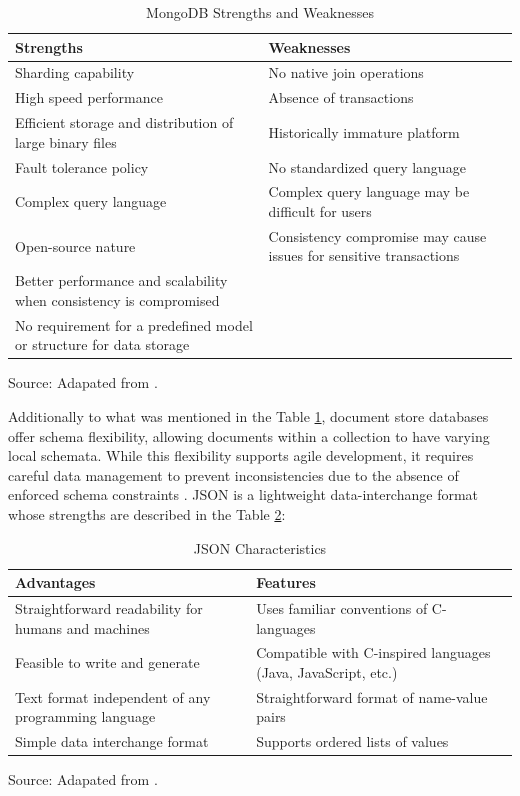 \begin{table}[H]
\centering
\caption{MongoDB Strengths and Weaknesses}
\label{mongodb_strenghts_weaknesses}
\begin{tabular}{p{}p{}}
\toprule
\textbf{Strengths} & \textbf{Weaknesses} \\
\midrule
Sharding capability & No native join operations \\ \hline
High speed performance & Absence of transactions \\ \hline
Efficient storage and distribution of large binary files & Historically immature platform \\ \hline
Fault tolerance policy & No standardized query language \\ \hline
Complex query language & Complex query language may be difficult for users \\ \hline
Open-source nature & Consistency compromise may cause issues for sensitive transactions \\ \hline
Better performance and scalability when consistency is compromised & \\ \hline
No requirement for a predefined model or structure for data storage & \\
\bottomrule
\end{tabular}
\footnotesize Source: Adapated from \cite{agrawal2015survey, hajoui2018nosql, jatana2012survey, leavitt2010will, mason2015nosql, nayak2013type}.
\end{table}


Additionally to what was mentioned in the Table \ref{mongodb_strenghts_weaknesses}, document store databases offer schema flexibility, allowing documents within a collection to have varying local schemata. While this flexibility supports agile development, it requires careful data management to prevent inconsistencies due to the absence of enforced schema constraints \cite{gallinucci2018schema}. JSON is a lightweight data-interchange format whose strengths are described in the Table \ref{json-characteristics}: 

\begin{table}[H]
\centering
\caption{JSON Characteristics}
\label{json-characteristics}
\begin{tabular}{p{}p{}}
\toprule
\textbf{Advantages} & \textbf{Features} \\
\midrule
Straightforward readability for humans and machines & 
Uses familiar conventions of C-languages \\ \hline
Feasible to write and generate & 
Compatible with C-inspired languages (Java, JavaScript, etc.) \\ \hline
Text format independent of any programming language & 
Straightforward format of name-value pairs \\ \hline
Simple data interchange format & Supports ordered lists of values \\
\bottomrule
\end{tabular}
\footnotesize Source: Adapated from \cite{jsonintroduction2025}.
\end{table}

